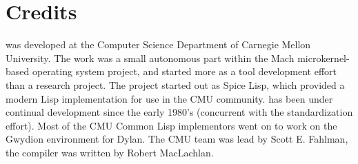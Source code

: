 \section{Credits}

\cmucl{} was developed at the Computer Science Department of Carnegie
Mellon University. The work was a small autonomous part within the
Mach microkernel-based operating system project, and started more as a
tool development effort than a research project. The project started
out as Spice Lisp, which provided a modern Lisp implementation for use
in the CMU community. \cmucl{} has been under continual development since
the early 1980's (concurrent with the \clisp{} standardization
effort). Most of the CMU Common Lisp implementors went on to work on
the Gwydion environment for Dylan. The CMU team was lead by Scott E.
Fahlman, the \python{} compiler was written by Robert MacLachlan.

